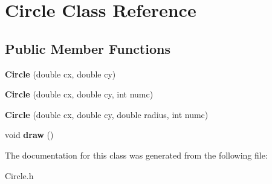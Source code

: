 \hypertarget{class_circle}{}\section{Circle Class Reference}
\label{class_circle}
\subsection*{Public Member Functions}
\begin{DoxyCompactItemize}
\item 
\mbox{\label{class_circle_aac0b09b2ce1f2561c2937037d3a0e986}} 
{\bfseries Circle} (double cx, double cy)
\item 
\mbox{\label{class_circle_a9da409203c0a3c27059663ec1ba5b84a}} 
{\bfseries Circle} (double cx, double cy, int numc)
\item 
\mbox{\label{class_circle_adc7fb01e543610dd34d127b5955b3b55}} 
{\bfseries Circle} (double cx, double cy, double radius, int numc)
\item 
\mbox{\label{class_circle_a3a3f7166e7f629e44f9044b0e537eb22}} 
void {\bfseries draw} ()
\end{DoxyCompactItemize}


The documentation for this class was generated from the following file\+:\begin{DoxyCompactItemize}
\item 
Circle.\+h\end{DoxyCompactItemize}
